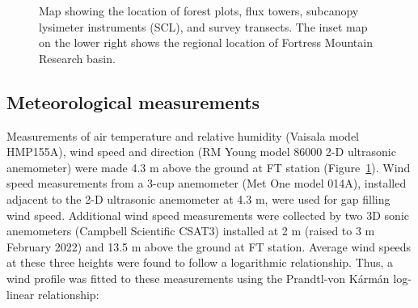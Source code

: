 \documentclass[
  letterpaper,
  DIV=11,
  numbers=noendperiod]{scrartcl}
\begin{document}
\begin{figure}[H]


\caption{\label{fig-site-map}Map showing the location of forest plots,
flux towers, subcanopy lysimeter instruments (SCL), and survey
transects. The inset map on the lower right shows the regional location
of Fortress Mountain Research basin.}

\end{figure}%

\subsection{Meteorological
measurements}\label{meteorological-measurements}

Measurements of air temperature and relative humidity (Vaisala model
HMP155A), wind speed and direction (RM Young model 86000 2-D ultrasonic
anemometer) were made 4.3 m above the ground at FT station
(Figure~\ref{fig-site-map}). Wind speed measurements from a 3-cup
anemometer (Met One model 014A), installed adjacent to the 2-D
ultrasonic anemometer at 4.3 m, were used for gap filling wind speed.
Additional wind speed measurements were collected by two 3D sonic
anemometers (Campbell Scientific CSAT3) installed at 2 m (raised to 3 m
February 2022) and 13.5 m above the ground at FT station. Average wind
speeds at these three heights were found to follow a logarithmic
relationship. Thus, a wind profile was fitted to these measurements
using the Prandtl-von Kármán log-linear relationship:
\end{document}

